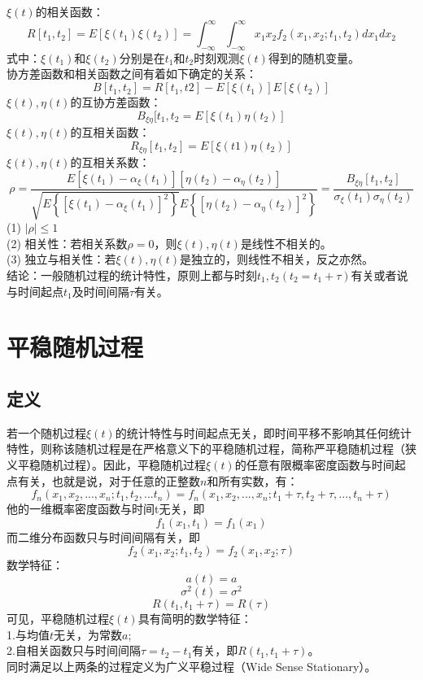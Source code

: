 \documentclass[12pt,a4paper,oneside]{ctexart}
\begin{document}
\indent $\xi(t)$的相关函数：
$$
R[t_{1},t_{2}] = E[\xi(t_{1})\xi(t_{2})] = \int_{-\infty}^{\infty}\int_{-\infty}^{\infty}x_{1}x_{2}f_{2}(x_{1},x_{2};t_{1},t_{2})dx_{1}dx_{2}
$$
\indent 式中：$\xi(t_{1})$和$\xi(t_{2})$分别是在$t_{1}$和$t_{2}$时刻观测$\xi(t)$得到的随机变量。\\
\indent 协方差函数和相关函数之间有着如下确定的关系：
$$
B[t_{1},t_{2}] = R[t_{1},t{2}] - E[\xi(t_{1})]E[\xi(t_{2})]
$$
\indent $\xi(t),\eta(t)$的互协方差函数：
$$
B_{\xi\eta}[t_{1},t_{2} = E[\xi(t_{1})\eta(t_{2})]
$$
\indent $\xi(t),\eta(t)$的互相关函数：
$$
R_{\xi\eta}[t_{1},t_{2}] = E[\xi(t1)\eta(t_{2})]
$$
\indent $\xi(t),\eta(t)$的互相关系数：
$$
\rho = \frac{E[\xi(t_{1}) - \alpha_{\xi}(t_{1})][\eta(t_{2}) - \alpha_{\eta}(t_{2})]}{\sqrt{E\left\{[\xi(t_{1}) - \alpha_{\xi}(t_{1})]^{2}\right\}}E\left\{[\eta(t_{2}) - \alpha_{\eta}(t_{2})]^{2}\right\}} = \frac{B_{\xi\eta}[t_{1},t_{2}]}{\sigma_{\xi}(t_{1})\sigma_{\eta}(t_{2})}
$$
\indent (1) $|\rho|\le 1$\\
\indent (2) 相关性：若相关系数$\rho = 0$，则$\xi(t),\eta(t)$是线性不相关的。\\
\indent (3) 独立与相关性：若$\xi(t),\eta(t)$是独立的，则线性不相关，反之亦然。\\
\indent 结论：一般随机过程的统计特性，原则上都与时刻$t_{1},t_{2}(t_{2} = t_{1} + \tau)$有关或者说与时间起点$t_{1}$及时间间隔$\tau$有关。
\section{平稳随机过程}
\subsection{定义}
若一个随机过程$\xi(t)$的统计特性与时间起点无关，即时间平移不影响其任何统计特性，则称该随机过程是在严格意义下的平稳随机过程，简称严平稳随机过程（狭义平稳随机过程）。因此，平稳随机过程$\xi(t)$的任意有限概率密度函数与时间起点有关，也就是说，对于任意的正整数$n$和所有实数，有：
$$
f_{n}(x_{1},x_{2},...,x_{n};t_{1},t_{2},...t_{n}) = f_{n}(x_{1},x_{2},...,x_{n};t_{1} + \tau, t_{2} + \tau,...,t_{n} + \tau)
$$
他的一维概率密度函数与时间t无关，即
$$
    f_{1}(x_{1},t_{1}) = f_{1}(x_{1})
$$
而二维分布函数只与时间间隔有关，即
$$
    f_{2}(x_{1},x_{2};t_{1},t_{2}) = f_{2}(x_{1},x_{2};\tau)
$$
数学特征：
$$
    a(t) = a
$$
$$
    \sigma^{2}(t) = \sigma^{2}
$$
$$
    R(t_{1},t_{1} + \tau) = R(\tau)
$$
可见，平稳随机过程$\xi(t)$具有简明的数学特征：\\
1.与均值$t$无关，为常数$a$;\\
2.自相关函数只与时间间隔$\tau = t_{2} - t_{1}$有关，即$R(t_{1},t_{1} + \tau)$。\\
同时满足以上两条的过程定义为广义平稳过程（Wide Sense Stationary）。
\end{document}
